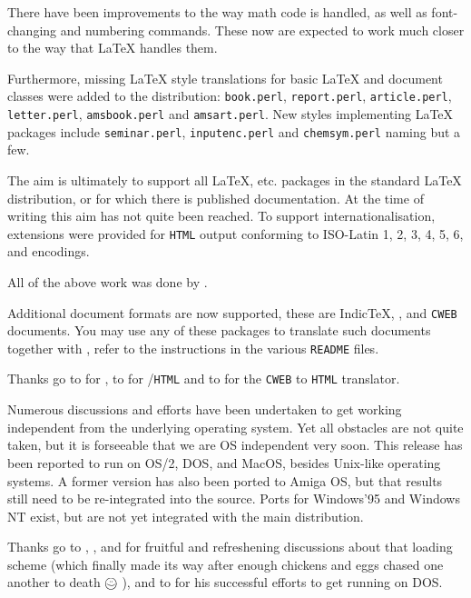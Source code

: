 \smallskip\noindent
There have been improvements to the way math code is handled, as well
as font-changing and numbering commands. These now are expected to
work much closer to the way that \LaTeX{} handles them.

\smallskip\noindent
Furthermore, missing \LaTeX{} style translations for basic \LaTeX{} 
and \AmSTeX{} document classes were added to the distribution: 
\texttt{book.perl}, \texttt{report.perl}, \texttt{article.perl},
\texttt{letter.perl}, \texttt{amsbook.perl} and \texttt{amsart.perl}.
New styles implementing \LaTeX{} packages include \texttt{seminar.perl},
\texttt{inputenc.perl} and \texttt{chemsym.perl} naming but a few.

The aim is ultimately to support all \LaTeX{}, \AmSTeX{} etc. packages in the 
standard \LaTeX{} distribution, or for which there is published documentation. 
At the time of writing this aim has not quite been reached.
To support internationalisation, \Perl{} extensions were provided for
\texttt{HTML} output conforming to ISO-Latin 1, 2, 3, 4, 5, 6,
and \Unicode{} encodings.

\smallskip\noindent
All of the above work was done by \RossMoore.
\bigskip

Additional document formats are now supported, these are Indic\TeX{},
\FoilTeX{}, and \texttt{CWEB} documents.
You may use any of these packages to translate such documents together
with \latextohtml{}, refer to the instructions in the various
\texttt{README} files.

\smallskip\noindent
Thanks go to \RossMoore{} for \IndicHTML{}, to \Veytsman{} for 
\FoilTeX{}/\texttt{HTML} and to \Lippmann{} for the \texttt{CWEB} to
\texttt{HTML} translator.

\bigskip
Numerous discussions and efforts have been undertaken to get
\latextohtml{} working independent from the underlying operating
system.
Yet all obstacles are not quite taken, but it is forseeable that we are
OS independent very soon.
This release has been reported to run on OS/2, DOS, and MacOS, besides
Unix-like operating systems.
A former version has also been ported to Amiga OS, but that results
still need to be re-integrated into the source.
Ports for Windows'95 and Windows NT exist, but are not yet
integrated with the main distribution.

\smallskip\noindent
Thanks go to \Hennecke, \AxelRamge, \Rouchal{} and \Wortmann{} for
fruitful and refreshening discussions about that 
loading scheme (which finally made its way after enough chickens and
eggs chased one another to death \mbox{$\mathsmiley$}\,),
and to \Taupin{} for his successful efforts to get \latextohtml{}
running on DOS.


